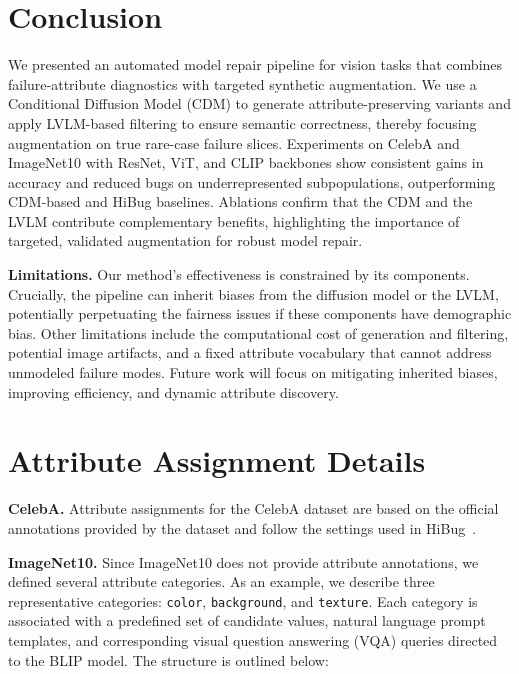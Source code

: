 \documentclass[10pt]{article} %
\newcommand{\hibug}{HiBug\xspace}
\begin{document}
\section{Conclusion}

We presented an automated model repair pipeline for vision tasks that combines failure‐attribute diagnostics with targeted synthetic augmentation. We use a Conditional Diffusion Model (CDM) to generate attribute-preserving variants and apply LVLM-based filtering to ensure semantic correctness, thereby focusing augmentation on true rare-case failure slices. Experiments on CelebA and ImageNet10 with ResNet, ViT, and CLIP backbones show consistent gains in accuracy and reduced bugs on underrepresented subpopulations, outperforming CDM-based and \hibug{} baselines. Ablations confirm that the CDM and the LVLM contribute complementary benefits, highlighting the importance of targeted, validated augmentation for robust model repair.

\noindent\textbf{Limitations.}
Our method’s effectiveness is constrained by its components. Crucially, the pipeline can inherit biases from the diffusion model or the LVLM, potentially perpetuating the fairness issues if these components have demographic bias. Other limitations include the computational cost of generation and filtering, potential image artifacts, and a fixed attribute vocabulary that cannot address unmodeled failure modes. Future work will focus on mitigating inherited biases, improving efficiency, and dynamic attribute discovery.








\clearpage
\appendix







\section{Attribute Assignment Details}
\label{sec:attribute_assignment}

\noindent \textbf{CelebA.} Attribute assignments for the CelebA dataset are based on the official annotations provided by the dataset and follow the settings used in \hibug~\citep{chen2023hibug}.

\noindent \textbf{ImageNet10.} Since ImageNet10 does not provide attribute annotations, we defined several attribute categories. As an example, we describe three representative categories: \texttt{color}, \texttt{background}, and \texttt{texture}. Each category is associated with a predefined set of candidate values, natural language prompt templates, and corresponding visual question answering (VQA) queries directed to the BLIP model. The structure is outlined below:
\end{document}
